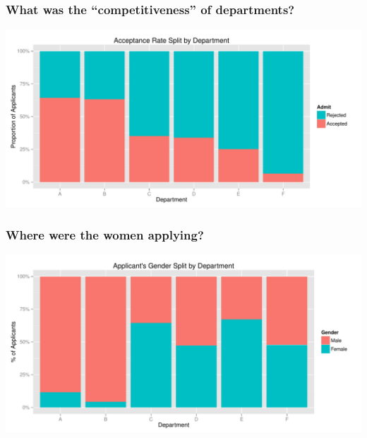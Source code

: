 \documentclass[handout]{beamer}
\begin{document}
\begin{frame}
\frametitle{What was the ``competitiveness'' of departments?}

\begin{center}
\includegraphics[width=\textwidth]{figure/dept-accpt.pdf}
\end{center}

\end{frame}



\begin{frame}
\frametitle{Where were the women applying?}

\begin{center}
\includegraphics[width=\textwidth]{figure/dept-gender.pdf}
\end{center}

\end{frame}
\end{document}
